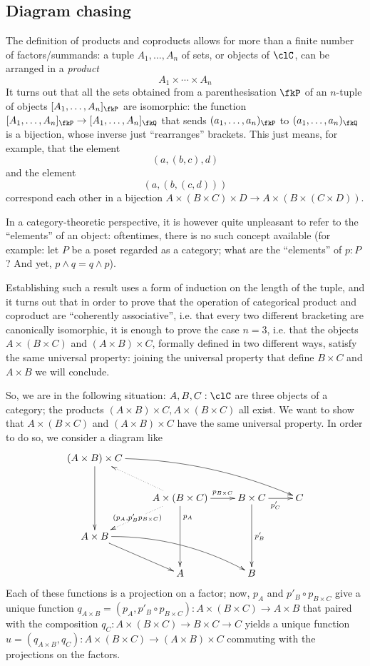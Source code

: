 \documentclass[11pt]{article}
\begin{document}
\subsection{Diagram chasing}
The definition of products and coproducts allows for more than a finite number of factors/summands: a tuple $A_1,\dots,A_n$ of sets, or objects of $\clC$, can be arranged in a \emph{product}
\[
A_1 \times \cdots \times A_n
\]
It turns out that all the sets obtained from a parenthesisation $\fkP$ of an $n$-tuple of objects $[A_1,\dots,A_n]_\fkP$ are isomorphic: the function $[A_1,\dots, A_n]_\fkP \to [A_1,\dots, A_n]_\fkQ$ that sends $(a_1,\dots, a_n)_\fkP$ to $(a_1,\dots, a_n)_\fkQ$ is a bijection, whose inverse just ``rearranges'' brackets. This just means, for example, that the element
\[(a,(b,c),d)\]
and the element
\[(a,(b,(c,d)))\]
correspond each other in a bijection $A\times (B\times C)\times D \to A\times (B\times (C\times D))$.

In a category-theoretic perspective, it is however quite unpleasant to refer to the ``elements'' of an object: oftentimes, there is no such concept available (for example: let $P$ be a poset regarded as a category; what are the ``elements'' of $p : P$? And yet, $p\land q = q\land p$).

Establishing such a result uses a form of induction on the length of the tuple, and it turns out that in order to prove that the operation of categorical product and coproduct are ``coherently associative'', i.e. that every two different bracketing are canonically isomorphic, it is enough to prove the case $n=3$, i.e. that the objects \(A\times (B\times C)\) and \((A\times B)\times C\), formally defined in two different ways, satisfy the same universal property: joining the universal property that define \(B\times C\) and \(A\times B\) we will conclude.

So, we are in the following situation: $A,B,C : \clC$ are three objects of a category; the products $(A\times B)\times C, A\times (B\times C)$ all exist. We want to show that \(A\times (B\times C)\) and \((A\times B)\times C\) have the same universal property. In order to do so, we consider a diagram like
\renewcommand{\objectstyle}{\scriptstyle}
\[  \xymatrix{
	 (A\times B)\times C\ar[dd] \ar@/^1pc/[drrr]\\
	& A\times (B\times C) \ar[dd]^(.25){p_A}\ar[r]^-{p_{B\times C}} \ar@{.>}[dl]|{(p_A,p'_Bp_{B\times C})}\ar@{.>}[ul] & B\times C\ar[dd]^{p'_B}\ar[r]_{p'_C} & C \\
	A\times B \ar[dr]\ar@/^1pc/[drr]& \\
	& A & B
	}\]
 \renewcommand{\objectstyle}{\textstyle}
 Each of these functions is a projection on a factor; now, \(p_A\) and \(p'_B\circ p_{B\times C}\) give a unique function \(q_{A\times B}=(p_A,p'_B\circ p_{B\times C}) : A\times (B\times C)\to A\times B\) that paired with the composition \(q_C : A\times (B\times C)\to B\times C \to C\) yields a unique function \(u = (q_{A\times B}, q_C) : A\times (B\times C) \to (A\times B)\times C\) commuting with the projections on the factors.
\end{document}
